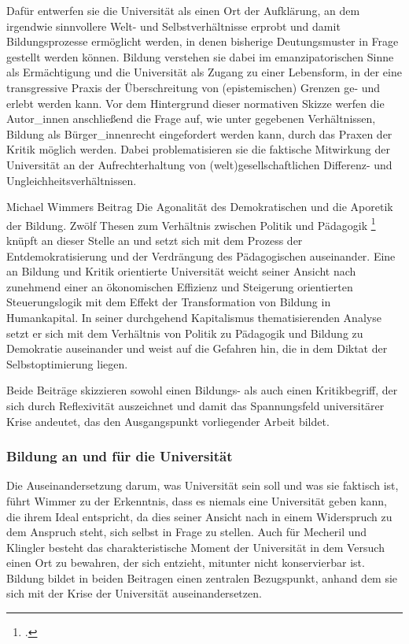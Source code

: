 Dafür entwerfen sie die Universität als
einen Ort der Aufklärung, an dem \glqq irgendwie sinnvollere Welt- und
Selbstverhältnisse \grqq \footnotemark {} erprobt und damit Bildungsprozesse ermöglicht werden, in denen bisherige Deutungsmuster in Frage gestellt werden können. Bildung
verstehen sie dabei im emanzipatorischen Sinne als Ermächtigung und die
Universität als Zugang zu einer Lebensform, in der eine transgressive Praxis
der Überschreitung von (epistemischen) Grenzen ge- und erlebt werden kann. Vor
dem Hintergrund dieser normativen Skizze werfen die Autor\_innen anschließend
die Frage auf, wie unter gegebenen Verhältnissen, Bildung als Bürger\_innenrecht
eingefordert werden kann, durch das Praxen der Kritik möglich werden. Dabei
problematisieren sie die faktische Mitwirkung der Universität an der
Aufrechterhaltung von (welt)gesellschaftlichen Differenz- und
Ungleichheitsverhältnissen.

Michael Wimmers Beitrag \glqq Die Agonalität des
Demokratischen und die Aporetik der Bildung. Zwölf Thesen zum Verhältnis
zwischen Politik und Pädagogik \grqq \footnotemark \footcitetext{wimmer} knüpft
an dieser Stelle an und setzt sich mit dem Prozess der Entdemokratisierung und
der Verdrängung des Pädagogischen \footnotemark {} auseinander. Eine an Bildung und Kritik
orientierte Universität weicht seiner Ansicht nach zunehmend \glqq einer an
ökonomischen Effizienz und Steigerung orientierten Steuerungslogik \grqq
\footnotemark {} mit dem
Effekt der Transformation von Bildung in Humankapital. In seiner durchgehend
Kapitalismus thematisierenden Analyse setzt er sich mit dem Verhältnis von
Politik zu Pädagogik und Bildung zu Demokratie auseinander und weist auf die
Gefahren hin, die in dem Diktat der Selbstoptimierung liegen.

Beide Beiträge skizzieren sowohl einen Bildungs- als auch einen Kritikbegriff, der sich durch
Reflexivität auszeichnet und damit das Spannungsfeld universitärer Krise
andeutet, das den Ausgangspunkt vorliegender Arbeit bildet. 

\subsubsection{Bildung an und für die Universität}

Die Auseinandersetzung darum, was Universität sein soll und was sie faktisch
ist, führt Wimmer zu der Erkenntnis, dass es niemals eine Universität geben
kann, die ihrem Ideal entspricht, da dies seiner Ansicht nach in einem
Widerspruch zu dem Anspruch steht, sich selbst in Frage zu
stellen.\footnotemark {} Auch für
Mecheril und Klingler besteht das charakteristische Moment der Universität in
dem Versuch einen Ort zu bewahren, \glqq der sich entzieht, mitunter nicht
konservierbar ist.\grqq \footnotemark {} Bildung bildet in beiden Beitragen einen zentralen
Bezugspunkt, anhand dem sie sich mit der Krise der Universität
auseinandersetzen.

